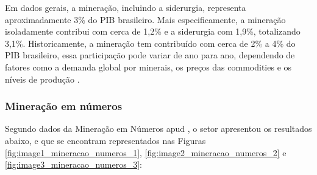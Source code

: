 Em dados gerais, a mineração, incluindo a siderurgia, representa aproximadamente 3\% do PIB brasileiro. Mais especificamente, a mineração isoladamente contribui com cerca de 1,2\% e a siderurgia com 1,9\%, totalizando 3,1\%. Historicamente, a mineração tem contribuído com cerca de 2\% a 4\% do PIB brasileiro, essa participação pode variar de ano para ano, dependendo de fatores como a demanda global por minerais, os preços das commodities e os níveis de produção \cite{apc2024industria}.

\subsubsection{Mineração em números}
\label{subsubsec:mineracao_numeros}

Segundo dados da Mineração em Números \cite{ibram2023coletiva} apud \cite{fonseca2024resultados}, o setor apresentou os resultados abaixo, e que se encontram
representados nas Figuras \ref{fig:image1_mineracao_numeros_1}, \ref{fig:image2_mineracao_numeros_2} e \ref{fig:image3_mineracao_numeros_3}:

